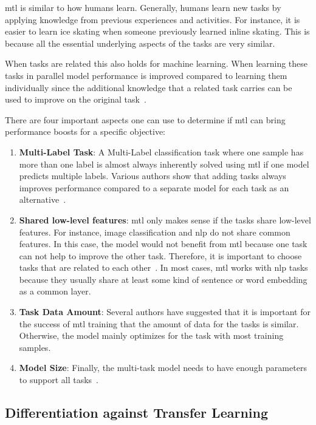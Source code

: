 \gls{mtl} is similar to how humans learn. Generally, humans learn new tasks by applying knowledge from previous experiences and activities. For instance, it is easier to learn ice skating when someone previously learned inline skating. This is because all the essential underlying aspects of the tasks are very similar.

When tasks are related this also holds for machine learning. When learning these tasks in parallel model performance is improved compared to learning them individually since the additional knowledge that a related task carries can be used to improve on the original task~\cite{Caruana1997a}. 

There are four important aspects one can use to determine if \gls{mtl} can bring performance boosts for a specific objective:
\begin{enumerate}
    \item \textbf{Multi-Label Task}: A Multi-Label classification task where one sample has more than one label is almost always inherently solved using \gls{mtl} if one model predicts multiple labels. Various authors show that adding tasks always improves performance compared to a separate model for each task as an alternative~\cite{Ramsundar2015}.
    \item \textbf{Shared low-level features}: \gls{mtl} only makes sense if the tasks share low-level features. For instance, image classification and \gls{nlp} do not share common features. In this case, the model would not benefit from \gls{mtl} because one task can not help to improve the other task. Therefore, it is important to choose tasks that are related to each other~\cite{Zhang2017a}. In most cases, \gls{mtl} works with \gls{nlp} tasks because they usually share at least some kind of sentence or word embedding as a common layer.
    \item \textbf{Task Data Amount}: Several authors have suggested that it is important for the success of \gls{mtl} training that the amount of data for the tasks is similar. Otherwise, the model mainly optimizes for the task with most training samples.
    \item \textbf{Model Size}: Finally, the multi-task model needs to have enough parameters to support all tasks~\cite{Caruana1997a}. 
    \end{enumerate}


\subsection{Differentiation against Transfer Learning}

